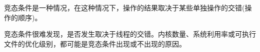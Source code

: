 竞态条件是一种情况，在这种情况下，操作的结果取决于某些单独操作的交错(操作的顺序)。

竞态条件很难发现，是否发生取决于线程的交错。内核数量、系统利用率或可执行文件的优化级别，都可能是竞态条件出现或不出现的原因。